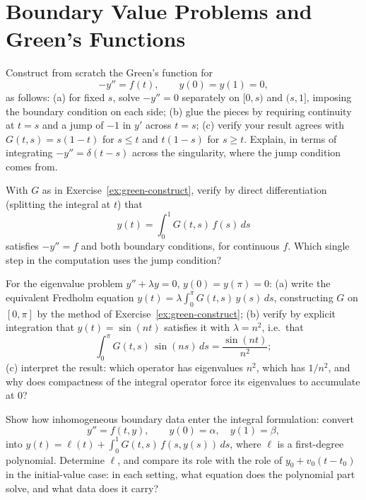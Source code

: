 \documentclass{essay}
\begin{document}
\section{Boundary Value Problems and Green's Functions}

\begin{exercise}\label{ex:green-construct}
  Construct from scratch the Green's function for
  \[
    -y'' = f(t), \qquad y(0) = y(1) = 0,
  \]
  as follows: (a) for fixed $s$, solve $-y'' = 0$ separately on $[0,s)$ and $(s,1]$, imposing the boundary condition on each side; (b) glue the pieces by requiring continuity at $t = s$ and a jump of $-1$ in $y'$ across $t = s$; (c) verify your result agrees with $G(t,s) = s(1-t)$ for $s \le t$ and $t(1-s)$ for $s \ge t$. Explain, in terms of integrating $-y'' = \delta(t - s)$ across the singularity, where the jump condition comes from.
\end{exercise}

\begin{exercise}\label{ex:green-verify}
  With $G$ as in Exercise~\ref{ex:green-construct}, verify by direct differentiation (splitting the integral at $t$) that
  \[
    y(t) = \int_0^1 G(t,s)\, f(s)\, ds
  \]
  satisfies $-y'' = f$ and both boundary conditions, for continuous $f$. Which single step in the computation uses the jump condition?
\end{exercise}

\begin{exercise}\label{ex:eigen}
  For the eigenvalue problem $y'' + \lambda y = 0$, $y(0) = y(\pi) = 0$: (a) write the equivalent Fredholm equation $y(t) = \lambda \int_0^\pi G(t,s)\, y(s)\, ds$, constructing $G$ on $[0,\pi]$ by the method of Exercise~\ref{ex:green-construct}; (b) verify by explicit integration that $y(t) = \sin(nt)$ satisfies it with $\lambda = n^2$, i.e.\ that
  \[
    \int_0^\pi G(t,s)\,\sin(ns)\, ds = \frac{\sin(nt)}{n^2};
  \]
  (c) interpret the result: which operator has eigenvalues $n^2$, which has $1/n^2$, and why does compactness of the integral operator force its eigenvalues to accumulate at $0$?
\end{exercise}

\begin{exercise}\label{ex:inhomog-bc}
  Show how inhomogeneous boundary data enter the integral formulation: convert
  \[
    y'' = f(t, y), \qquad y(0) = \alpha, \quad y(1) = \beta,
  \]
  into $y(t) = \ell(t) + \int_0^1 G(t,s)\, f(s, y(s))\, ds$, where $\ell$ is a first-degree polynomial. Determine $\ell$, and compare its role with the role of $y_0 + v_0(t - t_0)$ in the initial-value case: in each setting, what equation does the polynomial part solve, and what data does it carry?
\end{exercise}
\end{document}

